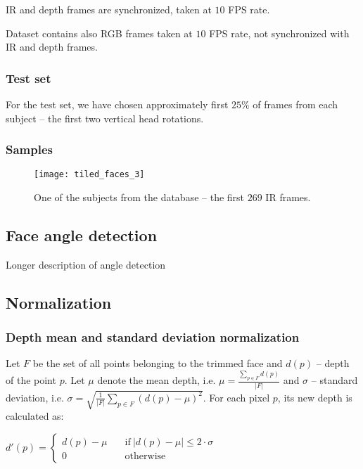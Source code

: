     IR and depth frames are synchronized, taken at $10$ FPS rate.

    Dataset contains also RGB frames taken at $10$ FPS rate, not synchronized
    with IR and depth frames.

    \subsubsection*{Test set}
    For the test set, we have chosen approximately first $25\%$ of
    frames from each subject -- the first two vertical head rotations.

    \subsubsection*{Samples}
    \begin{figure}[H]
    \caption{One of the subjects from the database -- the first $269$ IR frames.}
    \centering
    \texttt{[image: tiled\_faces\_3]}
    \end{figure}

    \subsection{Face angle detection}
    Longer description of angle detection

    \subsection{Normalization}
        \subsubsection*{Depth mean and standard deviation normalization}
        Let $F$ be the set of all points belonging to the trimmed face and
        $d(p)$ -- depth of the point $p$. Let $\mu$ denote the mean depth, i.e.
        $\mu = \frac{\sum\limits_{p \in F}{d(p)}}{|F|}$ and $\sigma$ -- standard
        deviation, i.e. $\sigma = \sqrt{\frac{1}{|F|} \sum\limits_{p \in F}{(d(p) - \mu)^2}}$.
        For each pixel $p$, its new depth is calculated as:

        \begin{center}
        $
          d'(p) = \begin{cases}
                  d(p) - \mu &\quad\text{if}\ |d(p) - \mu| \leqslant 2 \cdot \sigma \\
                  0 &\quad\text{otherwise}
                  \end{cases}
        $
        \end{center}


